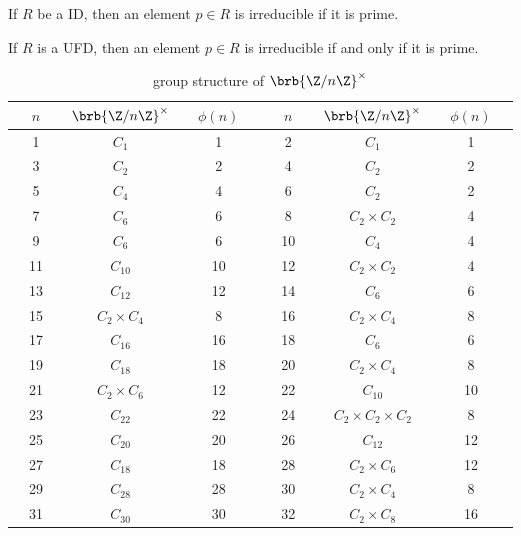 If $R$ be a ID, then an element $p \in R$ is irreducible if it is prime.

If $R$ is a UFD, then an element $p\in R$ is irreducible if and only if it is prime.


\begin{center}
\begin{longtable}{|ccccccc|ccccccc|}%
\caption{group structure of $\brb{\Z/n\Z}^\times$} \label{tab:group_structure_multiplicative_group_modular_ring}\\ %
\hline
& $n$ & & $\brb{\Z/n\Z}^\times$ & & $\phi(n)$ & & & $n$ & & $\brb{\Z/n\Z}^\times$ & & $\phi(n)$ & \\ %
\hline
& 1 & & $C_1$ & & 1 & & & 2 & & $C_1$ & & 1 & \\%
& 3 & & $C_2$ & & 2 & & & 4 & & $C_2$ & & 2 &  \\
& 5 & & $C_4$ & & 4 & & & 6 & & $C_2$ & & 2 & \\%
& 7 & & $C_6$ & & 6 & & & 8 & & $C_2\times C_2$ & & 4 &  \\
& 9 & & $C_6$ & & 6 & & & 10 & & $C_4$ & & 4 & \\%
& 11 & & $C_{10}$ & & 10 & & & 12 & & $C_2\times C_2$ & & 4 &  \\
& 13 & & $C_{12}$ & & 12 & & & 14 & & $C_6$ & & 6 & \\%
& 15 & & $C_2\times C_4$ & & 8 & & & 16 & & $C_2\times C_4$ & & 8 &  \\
& 17 & & $C_{16}$ & & 16 & & & 18 & & $C_6$ & & 6 & \\%
& 19 & & $C_{18}$ & & 18 & & & 20 & & $C_2\times C_4$ & & 8 &  \\
& 21 & & $C_{2}\times C_6$ & & 12 & & & 22 & & $C_{10}$ & & 10 & \\%
& 23 & & $C_{22}$ & & 22 & & & 24 & & $C_2\times C_2\times C_2$ & & 8 &  \\
& 25 & & $C_{20}$ & & 20 & & & 26 & & $C_{12}$ & & 12 & \\%
& 27 & & $C_{18}$ & & 18 & & & 28 & & $C_2\times C_6$ & & 12 &  \\
& 29 & & $C_{28}$ & & 28 & & & 30 & & $C_2\times C_4$ & & 8 & \\%
& 31 & & $C_{30}$ & & 30 & & & 32 & & $C_2\times C_8$ & & 16 &  \\
\hline%
\end{longtable}
\end{center}


